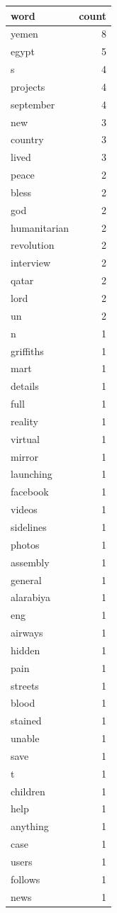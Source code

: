 \begin{tabular}{lr}
\toprule
word & count \\
\midrule
yemen & 8 \\
egypt & 5 \\
s & 4 \\
projects & 4 \\
september & 4 \\
new & 3 \\
country & 3 \\
lived & 3 \\
peace & 2 \\
bless & 2 \\
god & 2 \\
humanitarian & 2 \\
revolution & 2 \\
interview & 2 \\
qatar & 2 \\
lord & 2 \\
un & 2 \\
n & 1 \\
griffiths & 1 \\
mart & 1 \\
details & 1 \\
full & 1 \\
reality & 1 \\
virtual & 1 \\
mirror & 1 \\
launching & 1 \\
facebook & 1 \\
videos & 1 \\
sidelines & 1 \\
photos & 1 \\
assembly & 1 \\
general & 1 \\
alarabiya & 1 \\
eng & 1 \\
airways & 1 \\
hidden & 1 \\
pain & 1 \\
streets & 1 \\
blood & 1 \\
stained & 1 \\
unable & 1 \\
save & 1 \\
t & 1 \\
children & 1 \\
help & 1 \\
anything & 1 \\
case & 1 \\
users & 1 \\
follows & 1 \\
news & 1 \\
\bottomrule
\end{tabular}
